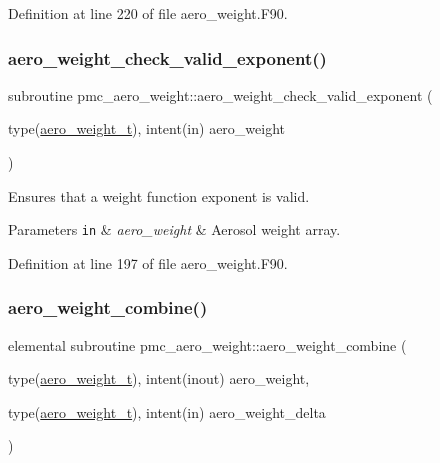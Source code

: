 Definition at line 220 of file aero\+\_\+weight.\+F90.

\mbox{\label{namespacepmc__aero__weight_a02ac941390da0ba2aeff1eeaf75eb5ca}} 
\subsubsection{\texorpdfstring{aero\+\_\+weight\+\_\+check\+\_\+valid\+\_\+exponent()}{aero\_weight\_check\_valid\_exponent()}}
{\footnotesize\ttfamily subroutine pmc\+\_\+aero\+\_\+weight\+::aero\+\_\+weight\+\_\+check\+\_\+valid\+\_\+exponent (\begin{DoxyParamCaption}\item[{type(\mbox{\hyperlink{structpmc__aero__weight_1_1aero__weight__t}{aero\+\_\+weight\+\_\+t}}), intent(in)}]{aero\+\_\+weight }\end{DoxyParamCaption})}



Ensures that a weight function exponent is valid. 


\begin{DoxyParams}[1]{Parameters}
\mbox{\tt in}  & {\em aero\+\_\+weight} & Aerosol weight array. \\
\hline
\end{DoxyParams}


Definition at line 197 of file aero\+\_\+weight.\+F90.

\mbox{\label{namespacepmc__aero__weight_a59ef26ebd83b97722ed819972ba7b78d}} 
\subsubsection{\texorpdfstring{aero\+\_\+weight\+\_\+combine()}{aero\_weight\_combine()}}
{\footnotesize\ttfamily elemental subroutine pmc\+\_\+aero\+\_\+weight\+::aero\+\_\+weight\+\_\+combine (\begin{DoxyParamCaption}\item[{type(\mbox{\hyperlink{structpmc__aero__weight_1_1aero__weight__t}{aero\+\_\+weight\+\_\+t}}), intent(inout)}]{aero\+\_\+weight,  }\item[{type(\mbox{\hyperlink{structpmc__aero__weight_1_1aero__weight__t}{aero\+\_\+weight\+\_\+t}}), intent(in)}]{aero\+\_\+weight\+\_\+delta }\end{DoxyParamCaption})}




